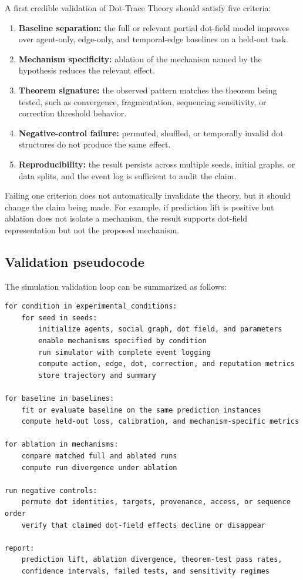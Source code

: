 \documentclass[11pt]{article}
\theoremstyle{remark}
\begin{document}
A first credible validation of Dot-Trace Theory should satisfy five criteria:

\begin{enumerate}[leftmargin=*]
\item \textbf{Baseline separation:} the full or relevant partial dot-field
model improves over agent-only, edge-only, and temporal-edge baselines on a
held-out task.
\item \textbf{Mechanism specificity:} ablation of the mechanism named by the
hypothesis reduces the relevant effect.
\item \textbf{Theorem signature:} the observed pattern matches the theorem being
tested, such as convergence, fragmentation, sequencing sensitivity, or
correction threshold behavior.
\item \textbf{Negative-control failure:} permuted, shuffled, or temporally
invalid dot structures do not produce the same effect.
\item \textbf{Reproducibility:} the result persists across multiple seeds,
initial graphs, or data splits, and the event log is sufficient to audit the
claim.
\end{enumerate}

Failing one criterion does not automatically invalidate the theory, but it
should change the claim being made. For example, if prediction lift is positive
but ablation does not isolate a mechanism, the result supports dot-field
representation but not the proposed mechanism.

\subsection{Validation pseudocode}\label{validation-pseudocode}

The simulation validation loop can be summarized as follows:

\begin{verbatim}
for condition in experimental_conditions:
    for seed in seeds:
        initialize agents, social graph, dot field, and parameters
        enable mechanisms specified by condition
        run simulator with complete event logging
        compute action, edge, dot, correction, and reputation metrics
        store trajectory and summary

for baseline in baselines:
    fit or evaluate baseline on the same prediction instances
    compute held-out loss, calibration, and mechanism-specific metrics

for ablation in mechanisms:
    compare matched full and ablated runs
    compute run divergence under ablation

run negative controls:
    permute dot identities, targets, provenance, access, or sequence order
    verify that claimed dot-field effects decline or disappear

report:
    prediction lift, ablation divergence, theorem-test pass rates,
    confidence intervals, failed tests, and sensitivity regimes
\end{verbatim}
\end{document}
